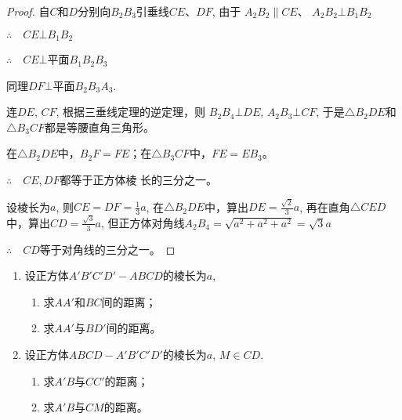 \begin{proof}
  自$C$和$D$分别向$B_2B_3$引垂线$CE$、$DF$, 由于
$A_2B_2\parallel CE$、 $A_2B_2\bot B_1B_2$

$\therefore\quad CE\bot B_1B_2$

$\therefore\quad CE\bot$平面$B_1B_2B_3$

同理$DF\bot $平面$B_2B_3A_3$.

连$DE$, $CF$, 根据三垂线定理的逆定理，则
$B_2B_4\bot DE$, $A_2B_3\bot CF$, 于是$\triangle B_2DE$和$\triangle B_3CF$都是等腰直角三角形。

在$\triangle B_2DE$中，$B_2F=FE$；在$\triangle B_3CF$中，$FE=EB_3$。

$\therefore\quad CE, DF$都等于正方体棱
长的三分之一。

设棱长为$a$, 则$CE=DF=\frac{1}{3}a$, 在$\triangle B_2DE$中，算出$DE=\frac{\sqrt{2}}{3}a$, 再在直角$\triangle CED$中，算出$CD=\frac{\sqrt{3}}{3}a$, 但正方体对角线$A_2B_4=\sqrt{a^2+a^2+a^2}=\sqrt{3}a$

$\therefore\quad CD$等于对角线的三分之一。
\end{proof}

\begin{ex}
\begin{enumerate}
  \item 设正方体$A'B'C'D'-ABCD$的棱长为$a$,
\begin{enumerate}
  \item 求$AA'$和$BC$间的距离；
  \item 求$AA'$与$BD'$间的距离。
\end{enumerate}
  
  \item 设正方体$ABCD-A'B'C'D'$的棱长为$a$, $M\in CD$.
\begin{enumerate}
  \item 求$A'B$与$CC'$的距离；
  \item 求$A'B$与$CM$的距离。
\end{enumerate}
\end{enumerate}
\end{ex}


